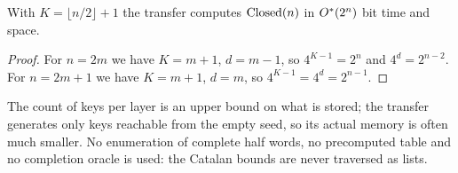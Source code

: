 \begin{corollary}[Balance]
\label{cor:balance}
With $K=\lfloor n/2\rfloor+1$ the transfer computes $\operatorname{Closed}(n)$ in
$O^{*}(2^{n})$ bit time and space.
\end{corollary}

\begin{proof}
For $n=2m$ we have $K=m+1$, $d=m-1$, so $4^{K-1}=2^{n}$ and $4^{d}=2^{n-2}$.
For $n=2m+1$ we have $K=m+1$, $d=m$, so $4^{K-1}=4^{d}=2^{n-1}$.
\end{proof}

\begin{remark}
The count of keys per layer is an upper bound on what is stored; the
transfer generates only keys reachable from the empty seed, so its actual
memory is often much smaller. No enumeration of complete half words, no
precomputed table and no completion oracle is used: the Catalan bounds are
never traversed as lists.
\end{remark}

